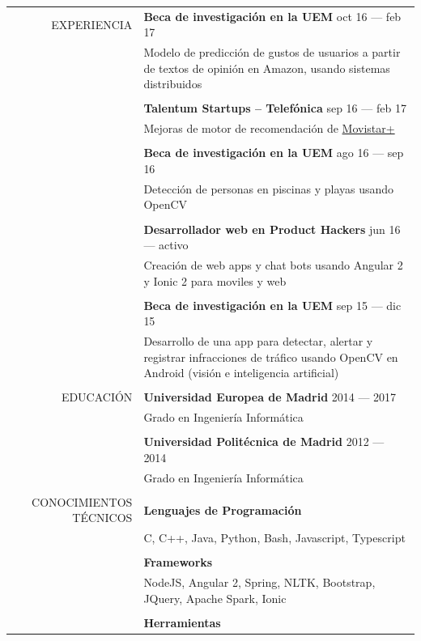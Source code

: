 \documentclass[a4paper, 11pt]{article}
\begin{document}
\begin{longtable}{rp{11cm}}
    EXPERIENCIA
    & {\bf Beca de investigación en la UEM} \hfill oct 16 --- feb 17\\
    & Modelo de predicción de gustos de usuarios a partir de textos de opinión en Amazon, usando sistemas distribuidos\\
    \\
    & {\bf Talentum Startups -- Telefónica} \hfill sep 16 --- feb 17\\
    & Mejoras de motor de recomendación de \href{http://ver.movistarplus.es/}{Movistar+}\\
    \\
    & {\bf Beca de investigación en la UEM} \hfill ago 16 --- sep 16\\
    & Detección de personas en piscinas y playas usando OpenCV\\
    \\
    & {\bf Desarrollador web en Product Hackers} \hfill jun 16 --- activo\\
    & Creación de web apps y chat bots usando Angular 2 y Ionic 2 para moviles y web\\
    \\
    & {\bf Beca de investigación en la UEM} \hfill sep 15 --- dic 15\\
    & Desarrollo de una app para detectar, alertar y registrar infracciones de tráfico usando OpenCV en Android (visión e inteligencia artificial)\\
    \\
    EDUCACIÓN
    & {\bf Universidad Europea de Madrid} \hfill 2014 --- 2017\\
    & Grado en Ingeniería Informática\\
    \\
    & {\bf Universidad Politécnica de Madrid} \hfill 2012 --- 2014\\
    & Grado en Ingeniería Informática\\
    \\
    CONOCIMIENTOS TÉCNICOS
    & {\bf Lenguajes de Programación}\\
    & C, C++, Java, Python, Bash, Javascript, Typescript\\
    \\
    & {\bf Frameworks}\\
    & NodeJS, Angular 2, Spring, NLTK, Bootstrap, JQuery, Apache Spark, Ionic\\
    \\
    & {\bf Herramientas}\\

\end{longtable}
\end{document}
